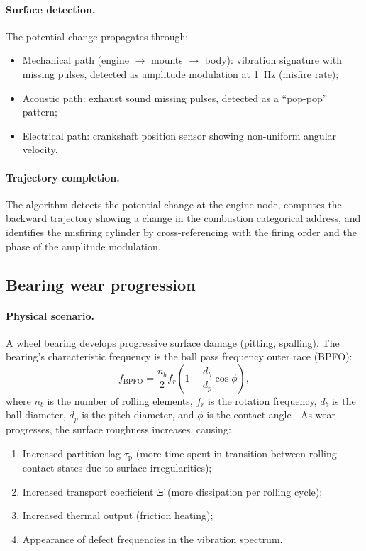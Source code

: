 \documentclass[twocolumn,10pt,a4paper]{article}
\theoremstyle{definition}
\theoremstyle{remark}
\newcommand{\tauP}{\tau_{\mathrm{p}}}
\begin{document}
\paragraph{Surface detection.} The potential change propagates through:
\begin{itemize}
\item Mechanical path (engine $\to$ mounts $\to$ body): vibration signature with missing pulses, detected as amplitude modulation at 1~Hz (misfire rate);
\item Acoustic path: exhaust sound missing pulses, detected as a ``pop-pop'' pattern;
\item Electrical path: crankshaft position sensor showing non-uniform angular velocity.
\end{itemize}

\paragraph{Trajectory completion.} The algorithm detects the potential change at the engine node, computes the backward trajectory showing a change in the combustion categorical address, and identifies the misfiring cylinder by cross-referencing with the firing order and the phase of the amplitude modulation.

\subsection{Bearing wear progression}\label{sec:bearing}

\paragraph{Physical scenario.} A wheel bearing develops progressive surface damage (pitting, spalling). The bearing's characteristic frequency is the ball pass frequency outer race (BPFO):
\begin{equation}
f_{\mathrm{BPFO}} = \frac{n_b}{2} f_r \left(1 - \frac{d_b}{d_p} \cos \phi\right),
\end{equation}
where $n_b$ is the number of rolling elements, $f_r$ is the rotation frequency, $d_b$ is the ball diameter, $d_p$ is the pitch diameter, and $\phi$ is the contact angle \citep{Randall2011}. As wear progresses, the surface roughness increases, causing:
\begin{enumerate}[label=(\alph*)]
\item Increased partition lag $\tauP$ (more time spent in transition between rolling contact states due to surface irregularities);
\item Increased transport coefficient $\Xi$ (more dissipation per rolling cycle);
\item Increased thermal output (friction heating);
\item Appearance of defect frequencies in the vibration spectrum.
\end{enumerate}
\end{document}
